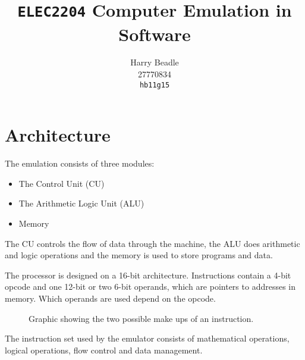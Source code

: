\documentclass[a4paper]{article}
\title{\texttt{ELEC2204} Computer Emulation in Software}
\author{Harry Beadle \\27770834\\\texttt{hb11g15}}
\begin{document}
\maketitle


\section{Architecture}

The emulation consists of three modules:

\begin{itemize}
    \item The Control Unit (CU)
    \item The Arithmetic Logic Unit (ALU)
    \item Memory
\end{itemize}

The CU controls the flow of data through the machine, the ALU does arithmetic and logic operations and the memory is used to store programs and data.

The processor is designed on a 16-bit architecture. Instructions contain a 4-bit opcode and one 12-bit or two 6-bit operands, which are pointers to addresses in memory. Which operands are used depend on the opcode.

\begin{figure}[H]
\centering
{}
\caption{Graphic showing the two possible make ups of an instruction.}
\end{figure}

The instruction set used by the emulator consists of mathematical operations, logical operations, flow control and data management.
\end{document}
